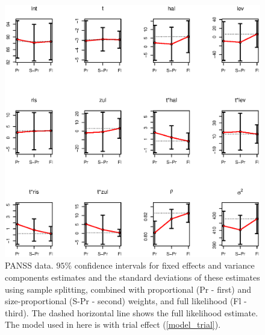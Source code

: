 \documentclass[11pt,a5paper,twoside]{book}
\begin{document}
{\begin{figure}[ht]
\centering
\includegraphics[width=\textwidth]{with_trial.eps}
\caption[PANSS data. $95\%$ confidence intervals for fixed effects and variance components estimates and the standard deviations of these estimates using sample splitting, combined with proportional and size-proportional weights, and full likelihood (with trial model)]{PANSS data. $95\%$ confidence intervals for fixed effects and variance components estimates and the standard deviations of these estimates using sample splitting, combined with proportional (Pr - first) and size-proportional (S-Pr - second) weights, and full likelihood (Fl - third). The dashed horizontal line shows the full likelihood estimate. The model used in here is with trial effect (\ref{model_trial}).} \label{fig_with_trial}
\end{figure}


}
\end{document}
